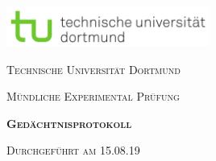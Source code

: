 



\begin{titlepage}
  \centering
  \includegraphics[width=0.5\textwidth]{pictures/tu-logo.png}\par\vspace{2cm}
  {\scshape\LARGE Technische Universität Dortmund \par}
  \vspace{1.5cm}
  {\scshape\Large Mündliche Experimental Prüfung\par}
  \vspace{1.5cm}
  {\scshape\LARGE\bfseries Gedächtnisprotokoll \par}
  \vspace{2.5cm}
  {\scshape Durchgeführt am 15.08.19 }
\end{titlepage}

\thispagestyle{empty}
\tableofcontents
\newpage



%




